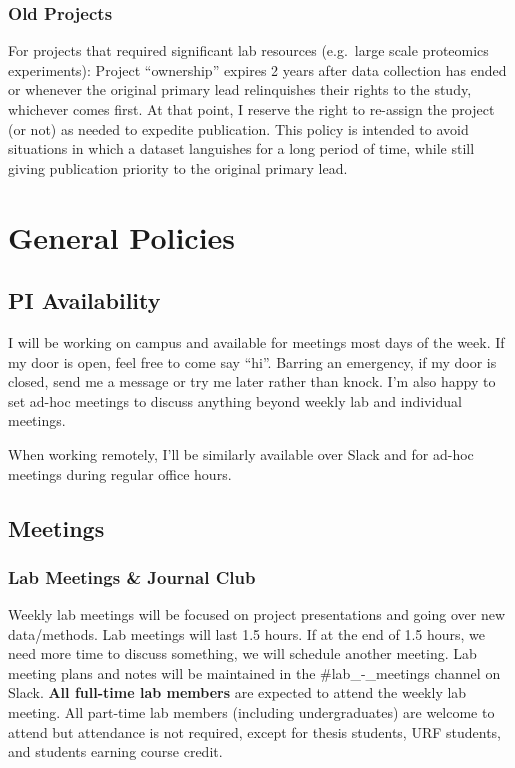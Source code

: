\documentclass[
]{book}
\begin{document}
\hypertarget{old-projects}{%
\subsection{Old Projects}\label{old-projects}}

For projects that required significant lab resources (e.g.~large scale proteomics experiments): Project ``ownership'' expires 2 years after data collection has ended or whenever the original primary lead relinquishes their rights to the study, whichever comes first. At that point, I reserve the right to re-assign the project (or not) as needed to expedite publication. This policy is intended to avoid situations in which a dataset languishes for a long period of time, while still giving publication priority to the original primary lead.

\hypertarget{general}{%
\chapter{General Policies}\label{general}}

\hypertarget{pi-availability}{%
\section{PI Availability}\label{pi-availability}}

I will be working on campus and available for meetings most days of the week. If my door is open, feel free to come say ``hi''. Barring an emergency, if my door is closed, send me a message or try me later rather than knock. I'm also happy to set ad-hoc meetings to discuss anything beyond weekly lab and individual meetings.

When working remotely, I'll be similarly available over Slack and for ad-hoc meetings during regular office hours.

\hypertarget{meetings}{%
\section{Meetings}\label{meetings}}

\hypertarget{lab-meetings-journal-club}{%
\subsection{Lab Meetings \& Journal Club}\label{lab-meetings-journal-club}}

Weekly lab meetings will be focused on project presentations and going over new data/methods. Lab meetings will last 1.5 hours. If at the end of 1.5 hours, we need more time to discuss something, we will schedule another meeting. Lab meeting plans and notes will be maintained in the \#lab\_-\_meetings channel on Slack. \textbf{All full-time lab members} are expected to attend the weekly lab meeting. All part-time lab members (including undergraduates) are welcome to attend but attendance is not required, except for thesis students, URF students, and students earning course credit.
\end{document}
